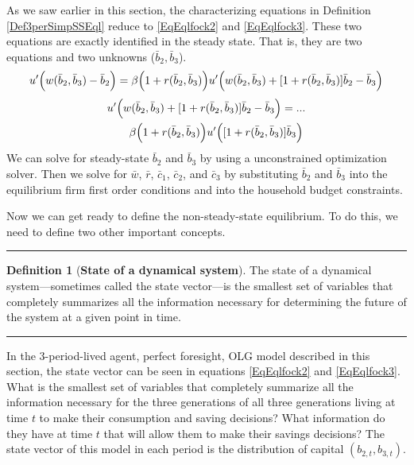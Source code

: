 \documentclass[letterpaper,12pt]{article}
\theoremstyle{definition}
\newtheorem{definition}[theorem]{Definition}
\numberwithin{equation}{section}
\numberwithin{exercise}{section}
\begin{document}
      \begin{spacing}{1.5}

      As we saw earlier in this section, the characterizing equations in Definition \ref{Def3perSimpSSEql} reduce to \eqref{EqEqlfock2} and \eqref{EqEqlfock3}. These two equations are exactly identified in the steady state. That is, they are two equations and two unknowns ($\bar{b}_2,\bar{b}_3$).
      \begin{equation}\label{EqEqlfock2SS}
         u'\Bigl(w(\bar{b}_2,\bar{b}_3) - \bar{b}_2\Bigr) = \beta\Bigl(1 + r(\bar{b}_2,\bar{b}_3)\Bigr)u'\Bigl(w(\bar{b}_2,\bar{b}_3) + [1 + r(\bar{b}_2,\bar{b}_3)]\bar{b}_2 - \bar{b}_3\Bigr)
      \end{equation}
      \begin{equation}\label{EqEqlfock3SS}
         \begin{split}
            &u'\Bigl(w(\bar{b}_2,\bar{b}_3) + [1 + r(\bar{b}_2,\bar{b}_3)]\bar{b}_2 - \bar{b}_3\Bigr) = ... \\
            &\quad\quad \beta\Bigl(1 + r(\bar{b}_2,\bar{b}_3)\Bigr)u'\Bigl([1 + r(\bar{b}_2,\bar{b}_3)]\bar{b}_3\Bigr)
         \end{split}
      \end{equation}
      We can solve for steady-state $\bar{b}_2$ and $\bar{b}_3$ by using a unconstrained optimization solver. Then we solve for $\bar{w}$, $\bar{r}$, $\bar{c}_1$, $\bar{c}_2$, and $\bar{c}_3$ by substituting $\bar{b}_2$ and $\bar{b}_3$ into the equilibrium firm first order conditions and into the household budget constraints.

      Now we can get ready to define the non-steady-state equilibrium. To do this, we need to define two other important concepts.

      \end{spacing}
      \vspace{5mm}
      \hrule
      \vspace{-1mm}
      \begin{definition}[\textbf{State of a dynamical system}]\label{DefStateSpace}
         The state of a dynamical system---sometimes called the state vector---is the smallest set of variables that completely summarizes all the information necessary for determining the future of the system at a given point in time.
      \end{definition}
      \vspace{-2mm}
      \hrule
      \vspace{5mm}
      \begin{spacing}{1.5}

      In the 3-period-lived agent, perfect foresight, OLG model described in this section, the state vector can be seen in equations \eqref{EqEqlfock2} and \eqref{EqEqlfock3}. What is the smallest set of variables that completely summarize all the information necessary for the three generations of all three generations living at time $t$ to make their consumption and saving decisions? What information do they have at time $t$ that will allow them to make their savings decisions? The state vector of this model in each period is the distribution of capital $(b_{2,t},b_{3,t})$.

      \end{spacing}
\end{document}

